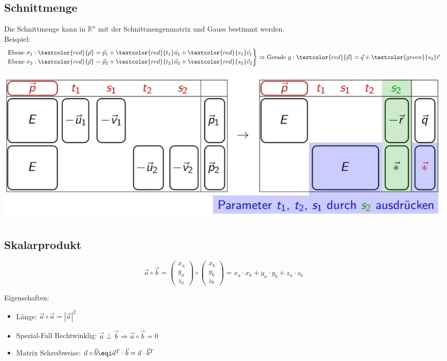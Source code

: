 \subsection{Schnittmenge}
Die Schnittmenge kann in $\mathbb{R}^n$ mit der Schnittmengenmatrix und Gauss bestimmt werden. \\
Beispiel:
\[
	\left.
	\begin{aligned}
		\text{Ebene } \sigma_1 : \textcolor{red}{\vec{p}} &= \vec{p}_1 + \textcolor{red}{t_1} \vec{u}_1 + \textcolor{red}{s_1} \vec{v}_1 \\
		\text{Ebene } \sigma_2 : \textcolor{red}{\vec{p}} &= \vec{p}_2 + \textcolor{red}{t_2} \vec{u}_2 + \textcolor{red}{s_2} \vec{v}_2 \\
	\end{aligned}
	\right\rbrace
	\Rightarrow
	\text{Gerade } g: \textcolor{red}{\vec{p}} = \vec{q} + \textcolor{green}{s_2} \vec{r}
\]

\includegraphics[width=\columnwidth]{./Images/Schnittmenge.png}

\subsection{Skalarprodukt}
\[\vec{a} \circ \vec{b} = \begin{pmatrix} x_a \\ y_a \\ z_a \end{pmatrix} \circ \begin{pmatrix} x_b \\ y_b \\ z_b \end{pmatrix} = x_a \cdot x_b + y_a \cdot y_b + z_a \cdot z_b\]

Eigenschaften:
\begin{itemize}[nosep]
	\item Länge: $\vec{a} \circ \vec{a} =|\vec{a}|^2$
	\item Spezial-Fall Rechtwinklig: $ \vec{a} \perp \vec{b} \Rightarrow \vec{a} \circ \vec{b} = 0 $
	\item Matrix Schreibweise: $\vec{a} \circ \vec{b} \eqi \vec{a}^T\cdot\vec{b} = \vec{a}\cdot\vec{b}^T$
\end{itemize}

